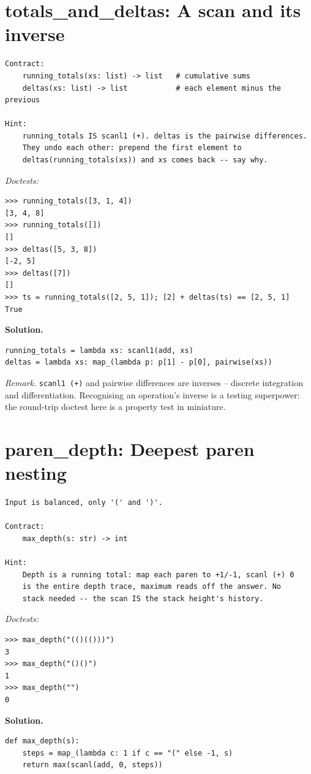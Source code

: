 \documentclass[11pt,letterpaper]{book}
\begin{document}
\section{totals\_and\_deltas: A scan and its inverse}
\begin{lstlisting}[style=spec]
Contract:
    running_totals(xs: list) -> list   # cumulative sums
    deltas(xs: list) -> list           # each element minus the previous

Hint:
    running_totals IS scanl1 (+). deltas is the pairwise differences.
    They undo each other: prepend the first element to
    deltas(running_totals(xs)) and xs comes back -- say why.
\end{lstlisting}
\noindent\textit{Doctests:}
\begin{lstlisting}[style=spec]
>>> running_totals([3, 1, 4])
[3, 4, 8]
>>> running_totals([])
[]
>>> deltas([5, 3, 8])
[-2, 5]
>>> deltas([7])
[]
>>> ts = running_totals([2, 5, 1]); [2] + deltas(ts) == [2, 5, 1]
True
\end{lstlisting}
\noindent\textbf{Solution.}
\begin{lstlisting}[style=code]
running_totals = lambda xs: scanl1(add, xs)
deltas = lambda xs: map_(lambda p: p[1] - p[0], pairwise(xs))
\end{lstlisting}

\noindent\textit{Remark.} \texttt{scanl1 (+)} and pairwise differences are
inverses -- discrete integration and differentiation. Recognising an operation's
inverse is a testing superpower: the round-trip doctest here is a property test
in miniature.

\section{paren\_depth: Deepest paren nesting}
\begin{lstlisting}[style=spec]
Input is balanced, only '(' and ')'.

Contract:
    max_depth(s: str) -> int

Hint:
    Depth is a running total: map each paren to +1/-1, scanl (+) 0
    is the entire depth trace, maximum reads off the answer. No
    stack needed -- the scan IS the stack height's history.
\end{lstlisting}
\noindent\textit{Doctests:}
\begin{lstlisting}[style=spec]
>>> max_depth("(()(()))")
3
>>> max_depth("()()")
1
>>> max_depth("")
0
\end{lstlisting}
\noindent\textbf{Solution.}
\begin{lstlisting}[style=code]
def max_depth(s):
    steps = map_(lambda c: 1 if c == "(" else -1, s)
    return max(scanl(add, 0, steps))
\end{lstlisting}
\end{document}
